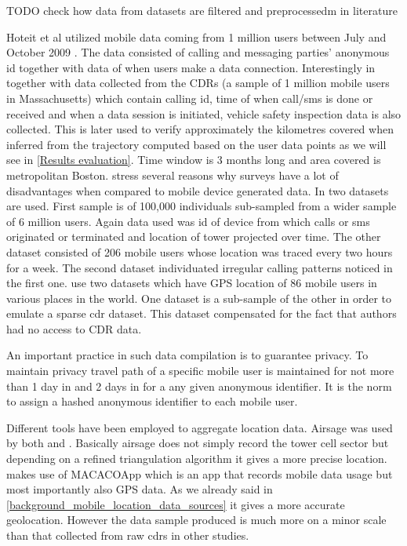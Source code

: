 \documentclass[12pt, a4paper]{report}
\theoremstyle{definition}
\theoremstyle{definition}%
\theoremstyle{definition}%
\theoremstyle{definition}%
\theoremstyle{definition}%
\theoremstyle{definition}%
\begin{document}
TODO check how data from datasets are filtered and preprocessedm in literature


Hoteit et al \cite{Hoteit2014} utilized mobile data coming from 1 million users between July and October 2009 \cite{Hoteit2014}. The data consisted of calling and messaging parties' anonymous id together with data of when users make a data connection. Interestingly in \cite{Calabrese2013} together with data collected from the CDRs (a sample of 1 million mobile users in Massachusetts) which contain calling id, time of when call/sms is done or received and when a data session is initiated, vehicle safety inspection data is also collected. This is later used to verify approximately the kilometres covered when inferred from the trajectory computed based on the user data points as we will see in \ref{Results evaluation}. Time window is 3 months long and area covered is metropolitan Boston.  \cite{Calabrese2013} \cite{Colak2015} stress several reasons why surveys have a lot of disadvantages when compared to mobile device generated data. In \cite{Gonzalez2008} two datasets are used. First sample is of 100,000 individuals sub-sampled from a wider sample of 6 million users. Again data used was id of device from which calls or sms originated or terminated and location of tower projected over time. The other dataset consisted of 206 mobile users whose location was traced every two hours for a week. The second dataset individuated irregular calling patterns noticed in the first one. \cite{Hoteit2016} use two datasets which have GPS location of 86 mobile users in various places in the world. One dataset is a sub-sample of the other in order to emulate a sparse cdr dataset. This dataset compensated for the fact that authors had no access to CDR data.  

An important practice in such data compilation is to guarantee privacy. To maintain privacy travel path of a specific mobile user is maintained for not more than 1 day in \cite{Hoteit2014} and 2 days in \cite{Calabrese2013} for a any given anonymous identifier. It is the norm to assign a hashed anonymous identifier to each mobile user. 

Different tools have been employed to aggregate location data. Airsage was used by both \cite{Hoteit2014} and \cite{Calabrese2013}. Basically airsage does not simply record the tower cell sector but depending on a refined triangulation algorithm it gives a more precise location.  \cite{Hoteit2016} makes use of MACACOApp which is an app that records mobile data usage but most importantly also GPS data. As we already said in \ref{background_mobile_location_data_sources} it gives a more accurate geolocation. However the data sample produced is much more on a minor scale than that collected from raw cdrs in other studies.
\end{document}
